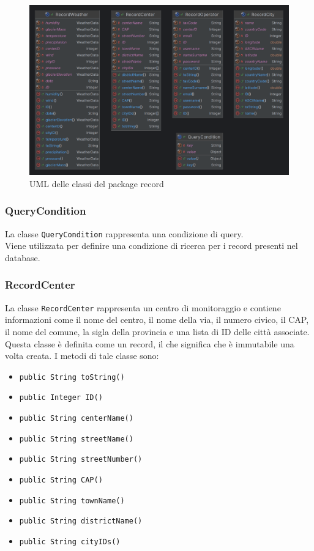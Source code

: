 \begin{figure}[H]
    \centering
    \includegraphics[scale = 0.2]{img/recordPackage.png}
    \caption{UML delle classi del package record}
    \label{fig:Record}
\end{figure}
\subsubsection{QueryCondition}
La classe \texttt{QueryCondition} rappresenta una condizione di query.\\
Viene utilizzata per definire una condizione di ricerca per i record presenti nel database.

\subsubsection{RecordCenter}
La classe \texttt{RecordCenter} rappresenta un centro di monitoraggio e contiene informazioni come il nome del centro, il nome della via, il numero civico, il CAP, il nome del comune, la sigla della provincia e una lista di ID delle città associate.
Questa classe è definita come un record, il che significa che è immutabile una volta creata.
I metodi di tale classe sono:
\begin{itemize}
    \item \texttt{public String toString()}
    \item \texttt{public Integer ID()}
    \item \texttt{public String centerName()}
    \item \texttt{public String streetName()}
    \item \texttt{public String streetNumber()}
    \item \texttt{public String CAP()}
    \item \texttt{public String townName()}
    \item \texttt{public String districtName()}
    \item \texttt{public String cityIDs()}
\end{itemize}

